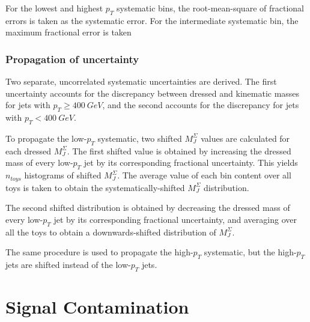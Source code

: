 For the lowest and highest $p_T$ systematic bins, the root-mean-square
of fractional errors is taken as the systematic error. For the
intermediate systematic bin, the maximum fractional error is taken

\subsubsection{Propagation of uncertainty}
Two separate, uncorrelated systematic uncertainties are derived. The first
uncertainty accounts for the discrepancy between dressed and kinematic
masses for jets with $p_T \geq 400~GeV$, and the second accounts for the
discrepancy for jets with $p_T < 400~GeV$.

To propagate the low-$p_T$ systematic, two shifted $M_{J}^{\Sigma}$
values are calculated for each dressed $M_{J}^{\Sigma}$. The first
shifted value is obtained by increasing the dressed mass of every
low-$p_T$ jet by its corresponding fractional uncertainty. This yields
$n_{toys}$ histograms of shifted $M_{J}^{\Sigma}$. The average value
of each bin content over all toys is taken to obtain the
systematically-shifted $M_{J}^{\Sigma}$ distribution. 

The second
shifted distribution is obtained by decreasing the dressed mass of every
low-$p_T$ jet by its corresponding fractional uncertainty, and
averaging over all the toys to obtain a downwards-shifted distribution
of $M_{J}^{\Sigma}$. 

The same procedure is used to propagate the high-$p_T$ systematic, but
the high-$p_T$ jets are shifted instead of the low-$p_T$ jets.



\section{Signal Contamination}
